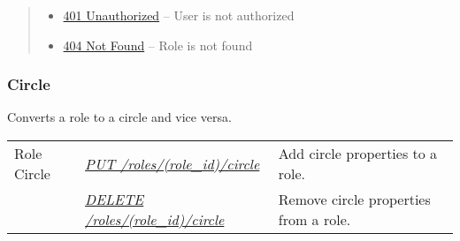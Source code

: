\documentclass[letterpaper,10pt,english]{sphinxmanual}
\begin{document}
\begin{fulllineitems}
\begin{quote}
\begin{description}
\begin{itemize}
\item {} 
\href{http://www.w3.org/Protocols/rfc2616/rfc2616-sec10.html\#sec10.4.2}{401 Unauthorized} -- User is not authorized

\item {} 
\href{http://www.w3.org/Protocols/rfc2616/rfc2616-sec10.html\#sec10.4.5}{404 Not Found} -- Role is not found

\end{itemize}

\end{description}\end{quote}

\end{fulllineitems}



\subsubsection{Circle}
\label{\detokenize{resources/role:circle}}
Converts a role to a circle and vice versa.

\noindent\begin{tabulary}{\linewidth}{|L|L|L|}
\hline
{}\relax &\relax &\relax \\
\hline
Role Circle
&
{\hyperref[\detokenize{resources/role:put--roles-(role_id)-circle}]{\emph{PUT /roles/(role\_id)/circle}}}
&
Add circle properties to a role.
\\
\hline&
{\hyperref[\detokenize{resources/role:delete--roles-(role_id)-circle}]{\emph{DELETE /roles/(role\_id)/circle}}}
&
Remove circle properties from a role.
\\
\hline\end{tabulary}


\begin{DUlineblock}{0em}
\item[] 
\end{DUlineblock}
\end{document}
